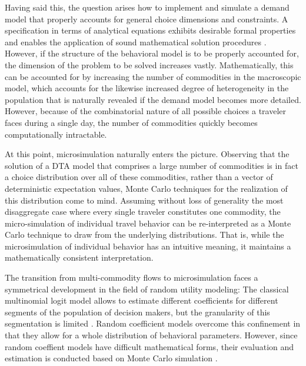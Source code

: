 
Having said this, the question arises how to implement and simulate a
demand model that properly accounts for general choice dimensions and
constraints. A specification in terms of analytical equations exhibits
desirable formal properties and enables the application of sound
mathematical solution procedures \citep[see,
  e.g., the supernetworks approach in][]{sheffi-1985,NagurneyEtcSupernetworks}. However, if the
structure of the behavioral model is to be properly accounted for, the
dimension of the problem to be solved increases
vastly. Mathematically, this can be accounted for by increasing the
number of commodities in the macroscopic model, which accounts for the
likewise increased degree of heterogeneity in the population that is
naturally revealed if the demand model becomes more detailed. However,
because of the combinatorial nature of all possible choices a traveler
faces during a single day, the number of commodities quickly becomes
computationally intractable.


At this point, microsimulation naturally enters the picture. Observing
that the solution of a DTA model that comprises a large number of
commodities is in fact 
%
a choice distribution over all of these commodities, rather than
%
a vector of deterministic expectation values,
%
Monte Carlo techniques for the realization of this distribution come
to mind. Assuming without loss of generality the most disaggregate
case where every single traveler constitutes one commodity, the
micro-simulation of individual travel behavior can be re-interpreted
as a Monte Carlo technique to draw from the underlying distributions.
That is, while the microsimulation of individual behavior has
an intuitive meaning, it maintains a mathematically consistent
interpretation.


%

The transition from multi-commodity flows to microsimulation faces a
symmetrical development in the field of random utility modeling:
The classical multinomial logit model allows to estimate different
coefficients for different segments of the population of decision
makers, but the granularity of this segmentation is limited 
\citep{ben-akiva-1985}. Random coefficient models overcome this
confinement in that they allow for a whole distribution of
behavioral parameters. However, since random coeffient models have
difficult mathematical forms, their evaluation and estimation is
conducted based on Monte Carlo simulation \citep{train-2003}.

